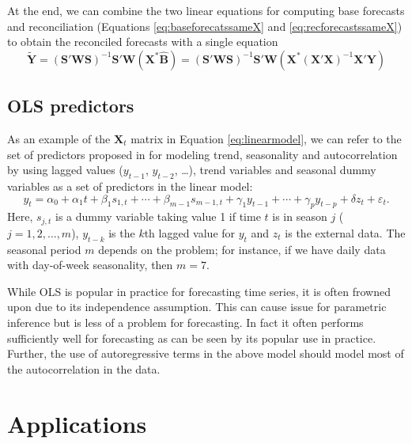 \documentclass[11pt,a4paper,]{article}
\begin{document}
At the end, we can combine the two linear equations for computing base forecasts and reconciliation (Equations \eqref{eq:baseforecatssameX} and \eqref{eq:recforecastssameX}) to obtain the reconciled forecasts with a single equation
\begin{equation}\label{eq:singlestepsameX}
\tilde{\bm{Y}} = (\bm{S}'\bm{W}\bm{S})^{-1}\bm{S}'\bm{W}
                        (\bm{X}^* \hat{\bm{B}})
                        = (\bm{S}'\bm{W}\bm{S})^{-1}\bm{S}'\bm{W}
                        (\bm{X}^* (\bm{X}'\bm{X})^{-1} \bm{X}'\bm{Y})
\end{equation}

\hypertarget{ols-predictors}{%
\subsection{OLS predictors}\label{ols-predictors}}

As an example of the \(\bm{X}_t\) matrix in Equation \eqref{eq:linearmodel}, we can refer to the set of predictors proposed in \textcite{ashouri2018} for modeling trend, seasonality and autocorrelation by using lagged values (\(y_{t-1}\), \(y_{t-2}\), \dots), trend variables and seasonal dummy variables as a set of predictors in the linear model:
\begin{equation}\label{eq:linearmodelexample}
    y_t = \alpha_0 + \alpha_1 t + \beta_1 s_{1,t} + \cdots + \beta_{m-1} s_{m-1,t} + \gamma_1 y_{t-1} + \cdots + \gamma_p y_{t-p} + \delta z_t + \varepsilon_t.
\end{equation}
Here, \(s_{j,t}\) is a dummy variable taking value 1 if time \(t\) is in season \(j\) (\(j=1, 2, \dots, m\)), \(y_{t-k}\) is the \(k\)th lagged value for \(y_t\) and \(z_t\) is the external data. The seasonal period \(m\) depends on the problem; for instance, if we have daily data with day-of-week seasonality, then \(m=7\).

While OLS is popular in practice for forecasting time series, it is often frowned upon due to its independence assumption. This can cause issue for parametric inference but is less of a problem for forecasting. In fact it often performs sufficiently well for forecasting as can be seen by its popular use in practice. Further, the use of autoregressive terms in the above model should model most of the autocorrelation in the data.

\hypertarget{applications}{%
\section{Applications}\label{applications}}
\end{document}
